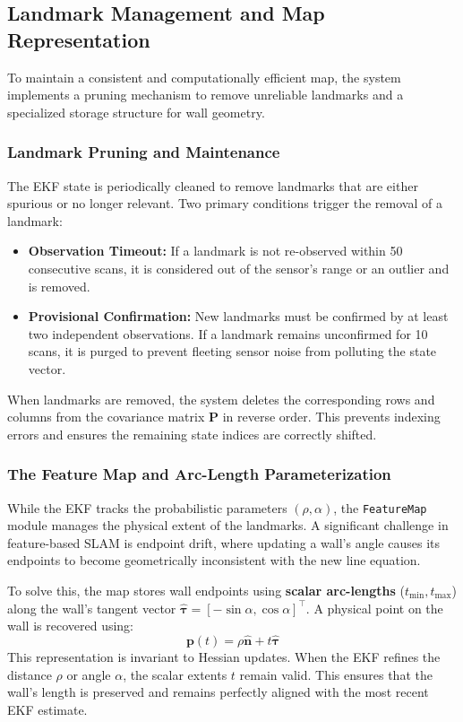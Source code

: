 \documentclass[11pt]{article}
\begin{document}
\subsection{Landmark Management and Map Representation}

To maintain a consistent and computationally efficient map, the system implements a pruning mechanism to remove unreliable landmarks and a specialized storage structure for wall geometry.

\subsubsection{Landmark Pruning and Maintenance}
The EKF state is periodically cleaned to remove landmarks that are either spurious or no longer relevant. Two primary conditions trigger the removal of a landmark:
\begin{itemize}
	\item \textbf{Observation Timeout:} If a landmark is not re-observed within 50 consecutive scans, it is considered out of the sensor's range or an outlier and is removed.
	\item \textbf{Provisional Confirmation:} New landmarks must be confirmed by at least two independent observations. If a landmark remains unconfirmed for 10 scans, it is purged to prevent fleeting sensor noise from polluting the state vector.
\end{itemize}

When landmarks are removed, the system deletes the corresponding rows and columns from the covariance matrix $\mathbf{P}$ in reverse order. This prevents indexing errors and ensures the remaining state indices are correctly shifted.

\subsubsection{The Feature Map and Arc-Length Parameterization}
While the EKF tracks the probabilistic parameters $(\rho, \alpha)$, the \texttt{FeatureMap} module manages the physical extent of the landmarks. A significant challenge in feature-based SLAM is endpoint drift, where updating a wall's angle causes its endpoints to become geometrically inconsistent with the new line equation.

To solve this, the map stores wall endpoints using \textbf{scalar arc-lengths} ($t_{\min}, t_{\max}$) along the wall's tangent vector $\hat{\boldsymbol{\tau}} = [-\sin\alpha, \cos\alpha]^\top$. A physical point on the wall is recovered using:
\begin{equation}
	\mathbf{p}(t) = \rho\hat{\mathbf{n}} + t\hat{\boldsymbol{\tau}}
\end{equation}
This representation is invariant to Hessian updates. When the EKF refines the distance $\rho$ or angle $\alpha$, the scalar extents $t$ remain valid. This ensures that the wall's length is preserved and remains perfectly aligned with the most recent EKF estimate.
\end{document}
